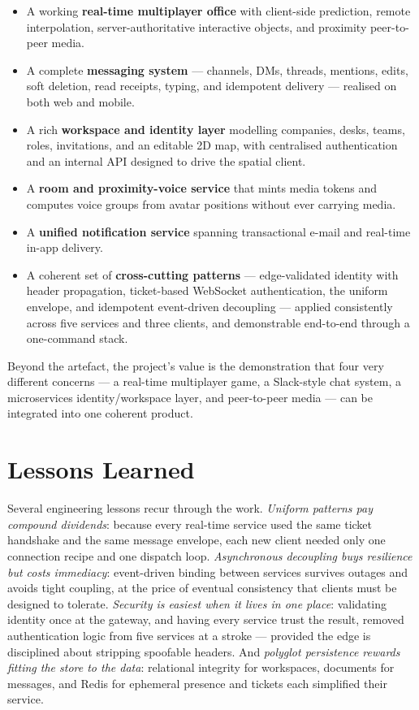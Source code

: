 \begin{itemize}
  \item A working \textbf{real-time multiplayer office} with client-side
  prediction, remote interpolation, server-authoritative interactive objects, and
  proximity peer-to-peer media.
  \item A complete \textbf{messaging system} --- channels, DMs, threads, mentions,
  edits, soft deletion, read receipts, typing, and idempotent delivery ---
  realised on both web and mobile.
  \item A rich \textbf{workspace and identity layer} modelling companies, desks,
  teams, roles, invitations, and an editable 2D map, with centralised
  authentication and an internal API designed to drive the spatial client.
  \item A \textbf{room and proximity-voice service} that mints media tokens and
  computes voice groups from avatar positions without ever carrying media.
  \item A \textbf{unified notification service} spanning transactional e-mail and
  real-time in-app delivery.
  \item A coherent set of \textbf{cross-cutting patterns} --- edge-validated
  identity with header propagation, ticket-based WebSocket authentication, the
  uniform  envelope, and idempotent event-driven
  decoupling --- applied consistently across five services and three clients, and
  demonstrable end-to-end through a one-command stack.
\end{itemize}

Beyond the artefact, the project's value is the demonstration that four very
different concerns --- a real-time multiplayer game, a Slack-style chat system, a
microservices identity/workspace layer, and peer-to-peer media --- can be
integrated into one coherent product.

\section{Lessons Learned}

Several engineering lessons recur through the work. \emph{Uniform patterns pay
compound dividends}: because every real-time service used the same ticket
handshake and the same message envelope, each new client needed only one
connection recipe and one dispatch loop. \emph{Asynchronous decoupling buys
resilience but costs immediacy}: event-driven binding between services survives
outages and avoids tight coupling, at the price of eventual consistency that
clients must be designed to tolerate. \emph{Security is easiest when it lives in
one place}: validating identity once at the gateway, and having every service
trust the result, removed authentication logic from five services at a stroke ---
provided the edge is disciplined about stripping spoofable headers. And
\emph{polyglot persistence rewards fitting the store to the data}: relational
integrity for workspaces, documents for messages, and Redis for ephemeral
presence and tickets each simplified their service.

